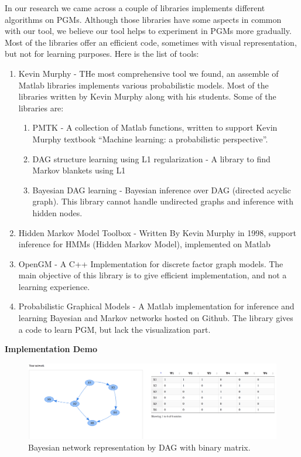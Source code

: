 \documentclass{article}
\begin{document}
    In our research we came across a couple of libraries implements different algorithms on PGMs. Although those libraries have some aspects in common with our tool, we believe our tool helps to experiment in PGMs more gradually. Most of the libraries offer an efficient code, sometimes with visual representation, but not for learning purposes. Here is the list of tools:
    \begin{enumerate}
        \item Kevin Murphy - THe most comprehensive tool we found, an assemble of Matlab libraries implements various probabilistic models. Most of the libraries written by Kevin Murphy along with his students. Some of the libraries are:
            \begin{enumerate}
                \item PMTK - A collection of Matlab functions, written to support Kevin Murphy textbook ``Machine learning: a probabilistic perspective''.
                \item DAG structure learning using L1 regularization - A library to find Markov blankets using L1
                \item Bayesian DAG learning - Bayesian inference over DAG (directed acyclic graph). This library cannot handle undirected graphs and inference with hidden nodes.
            \end{enumerate}
        \item Hidden Markov Model Toolbox - Written By Kevin Murphy in 1998, support inference for HMMs (Hidden Markov Model), implemented on Matlab
        \item OpenGM - A C++ Implementation for discrete factor graph models. The main objective of this library is to give efficient implementation, and not a learning experience.
        \item Probabilistic Graphical Models - A Matlab implementation for inference and learning Bayesian and Markov networks hosted on Github. The library gives a code to learn PGM, but lack the visualization part.
    \end{enumerate}

    \pagebreak

    \textbf{Implementation Demo}
    \begin{figure}[h!]
        \includegraphics[width=\linewidth]{img/network_binary_matrix.png}
        \caption{Bayesian network representation by DAG with binary matrix.}
        \label{fig:besian_network}
    \end{figure}
\end{document}
